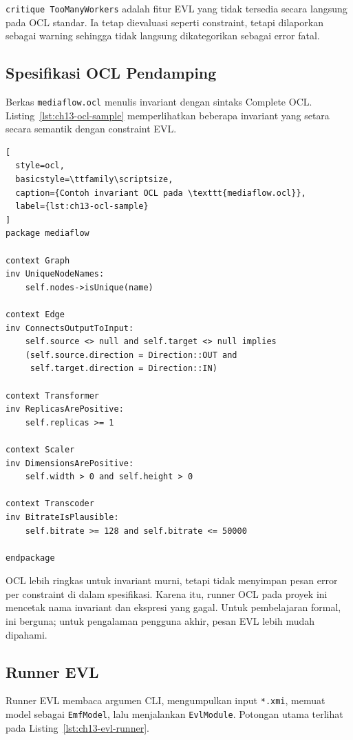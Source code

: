 \noindent \texttt{critique TooManyWorkers} adalah fitur EVL yang tidak tersedia secara langsung pada OCL standar. Ia tetap dievaluasi seperti constraint, tetapi dilaporkan sebagai warning sehingga tidak langsung dikategorikan sebagai error fatal.

\subsection{Spesifikasi OCL Pendamping}

Berkas \texttt{mediaflow.ocl} menulis invariant dengan sintaks Complete OCL. Listing~\ref{lst:ch13-ocl-sample} memperlihatkan beberapa invariant yang setara secara semantik dengan constraint EVL.

\begin{lstlisting}[
  style=ocl,
  basicstyle=\ttfamily\scriptsize,
  caption={Contoh invariant OCL pada \texttt{mediaflow.ocl}},
  label={lst:ch13-ocl-sample}
]
package mediaflow

context Graph
inv UniqueNodeNames:
    self.nodes->isUnique(name)

context Edge
inv ConnectsOutputToInput:
    self.source <> null and self.target <> null implies
    (self.source.direction = Direction::OUT and
     self.target.direction = Direction::IN)

context Transformer
inv ReplicasArePositive:
    self.replicas >= 1

context Scaler
inv DimensionsArePositive:
    self.width > 0 and self.height > 0

context Transcoder
inv BitrateIsPlausible:
    self.bitrate >= 128 and self.bitrate <= 50000

endpackage
\end{lstlisting}

\noindent OCL lebih ringkas untuk invariant murni, tetapi tidak menyimpan pesan error per constraint di dalam spesifikasi. Karena itu, runner OCL pada proyek ini mencetak nama invariant dan ekspresi yang gagal. Untuk pembelajaran formal, ini berguna; untuk pengalaman pengguna akhir, pesan EVL lebih mudah dipahami.

\subsection{Runner EVL}

Runner EVL membaca argumen CLI, mengumpulkan input \texttt{*.xmi}, memuat model sebagai \texttt{EmfModel}, lalu menjalankan \texttt{EvlModule}. Potongan utama terlihat pada Listing~\ref{lst:ch13-evl-runner}.

